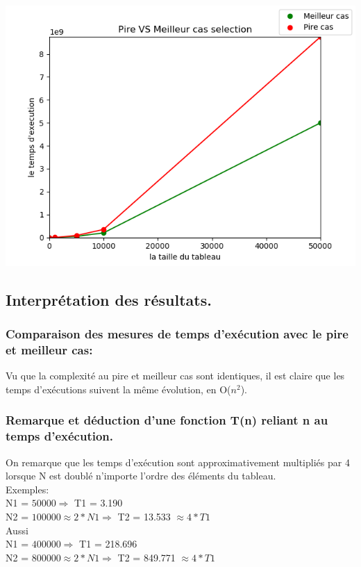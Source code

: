\documentclass[12pt]{article}
\begin{document}
\includegraphics[width=1\textwidth]{graphe/Pire_Meilleur_Selection.png}


\subsection{Interprétation des résultats.}
\subsubsection{Comparaison des mesures de temps d'exécution avec le pire et meilleur cas:}
	  
Vu que la complexité au pire et meilleur cas sont identiques, il est claire que les temps d'exécutions suivent la même évolution, en O($n^2$).

\subsubsection{Remarque et déduction d'une fonction T(n) reliant n au temps d'exécution.}

On remarque que les temps d'exécution sont approximativement multipliés par 4 lorsque N est doublé n'importe l'ordre des éléments du tableau.
\\

\color{blue}
Exemples:
\color{black} 
\\
N1 = $50000  \Rightarrow  $  T1 = 3.190
\\
N2 = $100000 \approx 2 * N1  \Rightarrow  $  T2 = 13.533 $\approx 4 * T1 $
\\

Aussi
\\
N1 = $400000 \Rightarrow $  T1 = 218.696
\\
N2 = $800000 \approx 2 * N1 \Rightarrow $  T2 = 849.771 $\approx 4 * T1 $
\\
\end{document}
